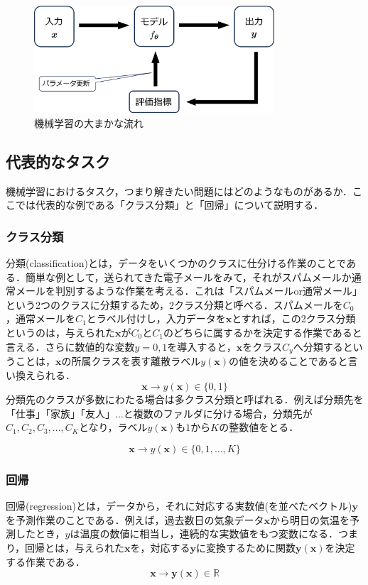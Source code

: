 \documentclass[a4paper,11pt]{jsreport}
\begin{document}
\begin{figure}[H]
  \begin{center}
    \includegraphics[height=4cm]{image/機械学習概要図.png}
    \caption{機械学習の大まかな流れ}
  \end{center}
\end{figure}

\subsection{代表的なタスク}
機械学習におけるタスク，つまり解きたい問題にはどのようなものがあるか．ここでは代表的な例である「クラス分類」と「回帰」について説明する．
\subsubsection*{クラス分類}
分類(classification)とは，データをいくつかのクラスに仕分ける作業のことである．簡単な例として，送られてきた電子メールをみて，それがスパムメールか通常メールを判別するような作業を考える．これは「スパムメールor通常メール」という2つのクラスに分類するため，2クラス分類と呼べる．スパムメールを$C_0$，通常メールを$C_1$とラベル付けし，入力データを$\bm{x}$とすれば，この2クラス分類というのは，与えられた$\bm{x}$が$C_0$と$C_1$のどちらに属するかを決定する作業であると言える．さらに数値的な変数$y = 0, 1$を導入すると，$\bm{x}$をクラス$C_{y}$へ分類するということは，$\bm{x}$の所属クラスを表す離散ラベル$y(\bm{x})$の値を決めることであると言い換えられる．
\begin{equation}
  \bm{x} \longrightarrow y(\bm{x}) \in \{0, 1\}
\end{equation}
分類先のクラスが多数にわたる場合は多クラス分類と呼ばれる．例えば分類先を「仕事」「家族」「友人」$\dots$と複数のファルダに分ける場合，分類先が$C_1,C_2,C_3,\dots,C_K$となり，ラベル$y(\bm{x})$も$1$から$K$の整数値をとる．\par
\begin{equation}
  \bm{x} \longrightarrow y(\bm{x}) \in \{0, 1, \dots, K\}
\end{equation}
\subsubsection*{回帰}
回帰(regression)とは，データから，それに対応する実数値(を並べたベクトル)$\bm{y}$を予測作業のことである．例えば，過去数日の気象データ$\bm{x}$から明日の気温を予測したとき，$y$は温度の数値に相当し，連続的な実数値をもつ変数になる．つまり，回帰とは，与えられた$\bm{x}$を，対応する$\bm{y}$に変換するために関数$\bm{y}(\bm{x})$を決定する作業である．
\begin{equation}
  \bm{x} \longrightarrow \bm{y}(\bm{x}) \in \mathbb{R}
\end{equation}
\end{document}
